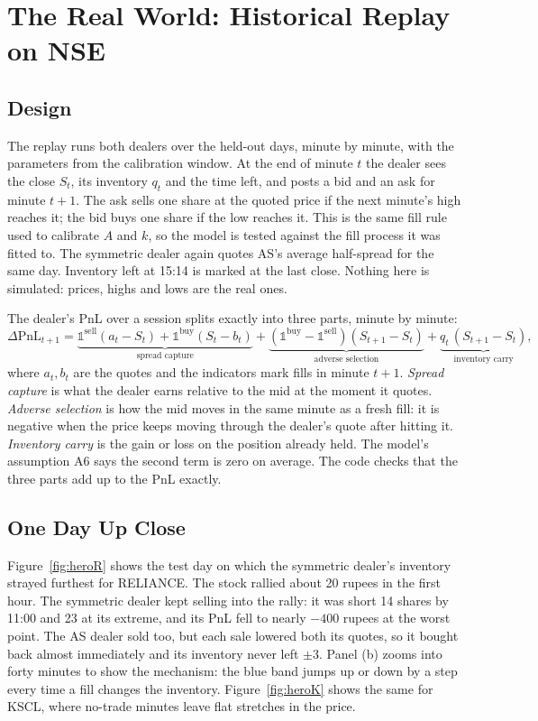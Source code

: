 \section{The Real World: Historical Replay on NSE}
\label{sec:replay}

\subsection{Design}

The replay runs both dealers over the \RELIANCETestDays{} held-out days, minute by minute, with
the parameters from the calibration window. At the end of minute $t$ the dealer sees the close $S_t$,
its inventory $q_t$ and the time left, and posts a bid and an ask for minute $t+1$. The ask sells one
share at the quoted price if the next minute's high reaches it; the bid buys one share if the low
reaches it. This is the same fill rule used to calibrate $A$ and $k$, so the model is tested against
the fill process it was fitted to. The symmetric dealer again quotes AS's average half-spread for the
same day. Inventory left at 15:14 is marked at the last close. Nothing here is simulated: prices,
highs and lows are the real ones.

The dealer's PnL over a session splits exactly into three parts, minute by minute:
\begin{equation}
\Delta\text{PnL}_{t+1} =
\underbrace{\mathbb{1}^{\text{sell}}(a_t-S_t)+\mathbb{1}^{\text{buy}}(S_t-b_t)}_{\text{spread capture}}
+\underbrace{(\mathbb{1}^{\text{buy}}-\mathbb{1}^{\text{sell}})(S_{t+1}-S_t)}_{\text{adverse selection}}
+\underbrace{q_t\,(S_{t+1}-S_t)}_{\text{inventory carry}} ,
\label{eq:decomp}
\end{equation}
where $a_t,b_t$ are the quotes and the indicators mark fills in minute $t+1$. \emph{Spread capture}
is what the dealer earns relative to the mid at the moment it quotes. \emph{Adverse selection} is how
the mid moves in the same minute as a fresh fill: it is negative when the price keeps moving through
the dealer's quote after hitting it. \emph{Inventory carry} is the gain or loss on the position
already held. The model's assumption A6 says the second term is zero on average. The code checks
that the three parts add up to the PnL exactly.

\subsection{One Day Up Close}

Figure~\ref{fig:heroR} shows the test day on which the symmetric dealer's inventory strayed
furthest for RELIANCE. The stock rallied about 20 rupees in the first hour. The symmetric dealer
kept selling into the rally: it was short 14 shares by 11:00 and 23 at its extreme, and its PnL
fell to nearly $-400$ rupees at the worst point.
The AS dealer sold too, but each sale lowered both its quotes, so it bought back almost immediately
and its inventory never left $\pm3$. Panel (b) zooms into forty minutes to show the mechanism: the
blue band jumps up or down by a step every time a fill changes the inventory. Figure~\ref{fig:heroK}
shows the same for KSCL, where no-trade minutes leave flat stretches in the price.

